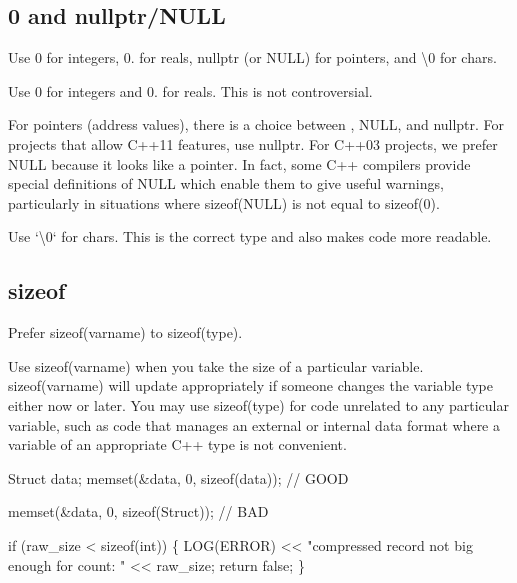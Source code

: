\subsection*{0 and nullptr/\+N\+U\+LL}

Use 0 for integers, 0. for reals, nullptr (or N\+U\+LL) for pointers, and \textquotesingle{}\textbackslash{}0\textquotesingle{} for chars.

Use 0 for integers and 0. for reals. This is not controversial.

For pointers (address values), there is a choice between {}, {\ttfamily N\+U\+LL}, and {\ttfamily nullptr}. For projects that allow C++11 features, use {\ttfamily nullptr}. For C++03 projects, we prefer {\ttfamily N\+U\+LL} because it looks like a pointer. In fact, some C++ compilers provide special definitions of {\ttfamily N\+U\+LL} which enable them to give useful warnings, particularly in situations where {\ttfamily sizeof(\+N\+U\+L\+L)} is not equal to {\ttfamily sizeof(0)}.

Use `\textquotesingle{}\textbackslash{}0\textquotesingle{}` for chars. This is the correct type and also makes code more readable.

\subsection*{sizeof}

Prefer {\ttfamily sizeof(varname)} to {\ttfamily sizeof(type)}.

Use {\ttfamily sizeof(varname)} when you take the size of a particular variable. {\ttfamily sizeof(varname)} will update appropriately if someone changes the variable type either now or later. You may use {\ttfamily sizeof(type)} for code unrelated to any particular variable, such as code that manages an external or internal data format where a variable of an appropriate C++ type is not convenient.


\begin{DoxyCode}
Struct data;
memset(&data, 0, \textcolor{keyword}{sizeof}(data)); \textcolor{comment}{// GOOD}

memset(&data, 0, \textcolor{keyword}{sizeof}(Struct)); \textcolor{comment}{// BAD}

\textcolor{keywordflow}{if} (raw\_size < \textcolor{keyword}{sizeof}(\textcolor{keywordtype}{int})) \{
    LOG(ERROR) << \textcolor{stringliteral}{"compressed record not big enough for count: "} << raw\_size;
    \textcolor{keywordflow}{return} \textcolor{keyword}{false};
\}
\end{DoxyCode}


